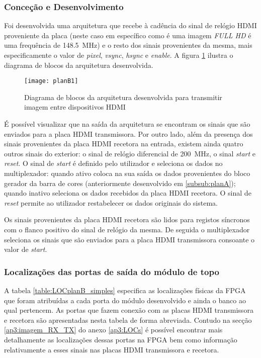 \subsubsection*{Conceção e Desenvolvimento}

Foi desenvolvida uma arquitetura que recebe à cadência do sinal de relógio HDMI proveniente da placa (neste caso em específico como é uma imagem \textit{FULL HD} é uma frequência de \SI{148.5}{\mega\hertz}) e o resto dos sinais provenientes da mesma, mais especificamente o valor de \textit{pixel}, \textit{vsync}, \textit{hsync} e \textit{enable}. A figura \ref{fig:planb1} ilustra o diagrama de blocos da arquitetura desenvolvida.

\begin{figure}[h!]
	\begin{center}
		\leavevmode
		\texttt{[image: planB1]}
		\caption{Diagrama de blocos da arquitetura desenvolvida para transmitir imagem entre dispositivos HDMI}
		\label{fig:planb1}
	\end{center}
\end{figure}

É possível visualizar que na saída da arquitetura se encontram os sinais que são enviados para a placa HDMI transmissora. Por outro lado, além da presença dos sinais provenientes da placa HDMI recetora na entrada, existem ainda quatro outros sinais do exterior: o sinal de relógio diferencial de \SI{200}{\mega\hertz}, o sinal \textit{start} e \textit{reset}. O sinal de \textit{start} é definido pelo utilizador e seleciona os dados no multiplexador: quando ativo coloca na sua saída os dados provenientes do bloco gerador da barra de cores (anteriormente desenvolvido em \ref{subsub:planA}); quando inativo seleciona os dados recebidos da placa HDMI recetora. O sinal de \textit{reset} permite ao utilizador restabelecer os dados originais do sistema.

Os sinais provenientes da placa HDMI recetora são lidos para registos síncronos com o flanco positivo do sinal de relógio da mesma. De seguida o multiplexador seleciona os sinais que são enviados para a placa HDMI transmissora consoante o valor de \textit{start}.

\subsubsection*{Localizações das portas de saída do módulo de topo} 

A tabela \ref{table:LOCplanB_simples} especifica as localizações físicas da FPGA que foram atribuídas a cada porta do módulo desenvolvido e ainda o banco ao qual pertencem. As portas que fazem conexão com as placas HDMI transmissora e recetora são apresentadas nesta tabela de forma abreviada. Contudo na secção \ref{ap3:imagem_RX_TX} do anexo \ref{ap3:LOCs} é possível encontrar mais detalhamente as localizações dessas portas na FPGA bem como informação relativamente a esses sinais nas placas HDMI transmissora e recetora.


